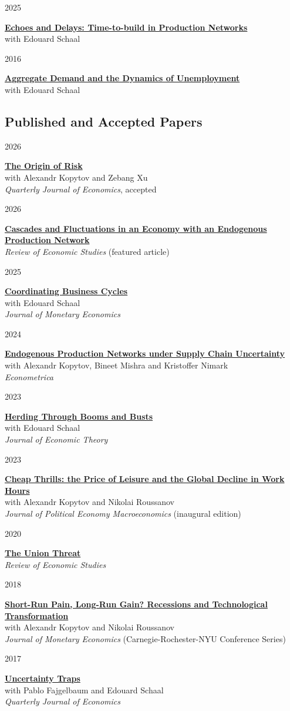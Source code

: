 \documentclass[letterpaper,11pt]{article}
\newcommand{\entry}[2]{\noindent\parbox[t]{0.12\textwidth}{\small #1}\begin{minipage}[t]{0.88\textwidth}#2\end{minipage}\par\vspace{0.7em}}
\begin{document}
\entry{2025}{\textbf{\href{https://www.mathtd.info/files/papers/Time\%20to\%20build/paper.pdf}{Echoes and Delays: Time-to-build in Production Networks}}\\
with Edouard Schaal}
\entry{2016}{\textbf{\href{https://www.mathtd.info/files/papers/Coordination\%20and\%20the\%20Dynamics\%20of\%20Unemployment/paper.pdf}{Aggregate Demand and the Dynamics of Unemployment}}\\
with Edouard Schaal}

\subsection{Published and Accepted Papers}
\entry{2026}{\textbf{\href{https://www.mathtd.info/files/papers/origin_risk/paper.pdf}{The Origin of Risk}}\\
with Alexandr Kopytov and Zebang Xu\\
\textit{Quarterly Journal of Economics}, accepted}
\entry{2026}{\textbf{\href{https://doi.org/10.1093/restud/rdaf036}{Cascades and Fluctuations in an Economy with an Endogenous Production Network}}\\
\textit{Review of Economic Studies} (featured article)}
\entry{2025}{\textbf{\href{https://doi.org/10.1016/j.jmoneco.2025.103829}{Coordinating Business Cycles}}\\
with Edouard Schaal\\
\textit{Journal of Monetary Economics}}
\entry{2024}{\textbf{\href{https://doi.org/10.3982/ECTA20629}{Endogenous Production Networks under Supply Chain Uncertainty}}\\
with Alexandr Kopytov, Bineet Mishra and Kristoffer Nimark\\
\textit{Econometrica}}
\entry{2023}{\textbf{\href{https://doi.org/10.1016/j.jet.2023.105669}{Herding Through Booms and Busts}}\\
with Edouard Schaal\\
\textit{Journal of Economic Theory}}
\entry{2023}{\textbf{\href{https://doi.org/10.1086/723717}{Cheap Thrills: the Price of Leisure and the Global Decline in Work Hours}}\\
with Alexandr Kopytov and Nikolai Roussanov\\
\textit{Journal of Political Economy Macroeconomics} (inaugural edition)}
\entry{2020}{\textbf{\href{https://doi.org/10.1093/restud/rdaa027}{The Union Threat}}\\
\textit{Review of Economic Studies}}
\entry{2018}{\textbf{\href{https://doi.org/10.1016/j.jmoneco.2018.05.011}{Short-Run Pain, Long-Run Gain? Recessions and Technological Transformation}}\\
with Alexandr Kopytov and Nikolai Roussanov\\
\textit{Journal of Monetary Economics} (Carnegie-Rochester-NYU Conference Series)}
\entry{2017}{\textbf{\href{https://doi.org/10.1093/qje/qjx021}{Uncertainty Traps}}\\
with Pablo Fajgelbaum and Edouard Schaal\\
\textit{Quarterly Journal of Economics}}
\end{document}
